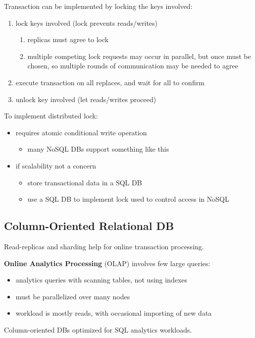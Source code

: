 \documentclass[11pt]{article}
\begin{document}
Transaction can be implemented by locking the keys involved:
\begin{enumerate}
\item lock keys involved (lock prevents reads/writes)
\begin{enumerate}
\item replicas must agree to lock
\item multiple competing lock requests may occur in parallel, but once must
be chosen, so multiple rounds of communication may be needed to agree
\end{enumerate}
\item execute transaction on all replaces, and wait for all to confirm
\item unlock key involved (let reads/writes proceed)
\end{enumerate}

To implement distributed lock:
\begin{itemize}
\item requires atomic conditional write operation
\begin{itemize}
\item many NoSQL DBs support something like this
\end{itemize}
\item if scalability not a concern
\begin{itemize}
\item store transactional data in a SQL DB
\item use a SQL DB to implement lock used to control access in NoSQL
\end{itemize}
\end{itemize}
\subsection{Column-Oriented Relational DB}
\label{sec:org24cee10}
Read-replicas and sharding help for online transaction processing.

\textbf{Online Analytics Processing} (OLAP) involves few large queries:
\begin{itemize}
\item analytics queries with scanning tables, not using indexes
\item must be parallelized over many nodes
\item workload is mostly reads, with occasional importing of new data
\end{itemize}

Column-oriented DBs optimized for SQL analytics workloads.
\end{document}
